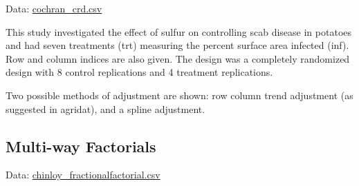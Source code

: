\documentclass[
]{book}
\newenvironment{Shaded}{\begin{snugshade}}{\end{snugshade}}
\newcommand{\NormalTok}[1]{#1}
\begin{document}
Data: \href{https://raw.githubusercontent.com/IdahoAgStats/guide-to-field-trial-spatial-analysis/master/data/cochran_crd.csv}{cochran\_crd.csv}

This study investigated the effect of sulfur on controlling scab disease in potatoes and had seven treatments (trt) measuring the percent surface area infected (inf). Row and column indices are also given. The design was a completely randomized design with 8 control replications and 4 treatment replications.

Two possible methods of adjustment are shown: row column trend adjustment (as suggested in agridat), and a spline adjustment.

\begin{Shaded}
\end{Shaded}

\hypertarget{multi-way-factorials-1}{%
\subsection{Multi-way Factorials}\label{multi-way-factorials-1}}

Data: \href{https://raw.githubusercontent.com/IdahoAgStats/guide-to-field-trial-spatial-analysis/master/data/chinloy_fractionalfactorial.csv}{chinloy\_fractionalfactorial.csv}
\end{document}
